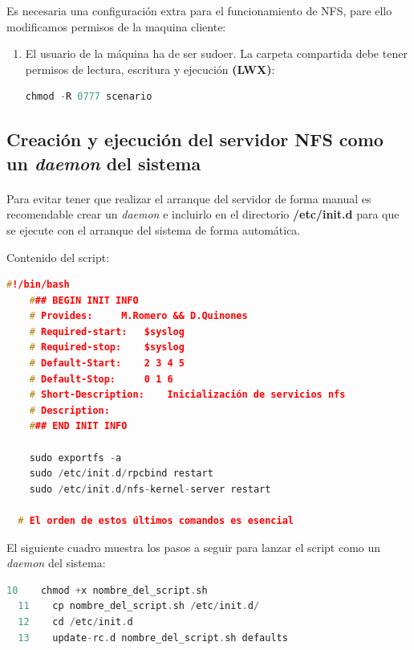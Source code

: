 Es necesaria una configuración extra para el funcionamiento de NFS, pare ello modificamos permisos de la maquina cliente:
\begin{enumerate}

\item El usuario de la máquina ha de ser sudoer. La carpeta compartida debe tener permisos de lectura, escritura y ejecución \textbf{(LWX)}:

\begin{lstlisting}[language=c,frame=single,numbers=none]
    chmod -R 0777 scenario
\end{lstlisting}

\end{enumerate}
\subsection{Creación y ejecución del servidor NFS como un  \textit{daemon} del sistema}
\paragraph{}

Para evitar tener que realizar el arranque del servidor de forma manual es recomendable crear un \textit{daemon} e incluirlo en el directorio \textbf{/etc/init.d} para que se ejecute con el arranque del sistema de forma automática.

Contenido del script:

\begin{lstlisting}[language=c,frame=single,numbers=none]
	#!/bin/bash
	### BEGIN INIT INFO
	# Provides:		M.Romero && D.Quinones
	# Required-start:	$syslog
	# Required-stop:	$syslog
	# Default-Start:	2 3 4 5
	# Default-Stop:		0 1 6
	# Short-Description:	Inicialización de servicios nfs
	# Description:	
	### END INIT INFO

	sudo exportfs -a
	sudo /etc/init.d/rpcbind restart
	sudo /etc/init.d/nfs-kernel-server restart

  # El orden de estos últimos comandos es esencial
\end{lstlisting}

El siguiente cuadro muestra los pasos a seguir para lanzar el script como un \textit{daemon} del sistema:

\begin{lstlisting}[language=c,frame=single,numbers=none]
  10	chmod +x nombre_del_script.sh
  11	cp nombre_del_script.sh /etc/init.d/
  12	cd /etc/init.d
  13	update-rc.d nombre_del_script.sh defaults
\end{lstlisting}

